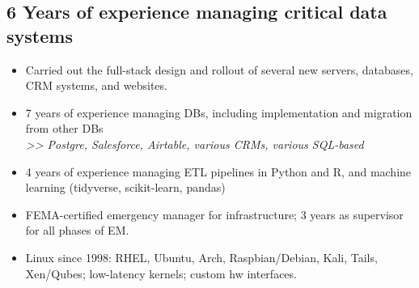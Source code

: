\documentclass[]{deedy-resume-openfont}
\begin{document}


\vspace{5pt} 
\vspace{\topsep}

\subsection{6 Years of experience managing critical data systems}
\vspace{\topsep}
    \begin{itemize}
    	\item Carried out the full-stack design and rollout of several new servers, databases, CRM systems, and websites.
        \item 7 years of experience managing DBs, including implementation and migration from other DBs \\ \textit{>> Postgre, Salesforce, Airtable, various CRMs, various SQL-based}
        \item 4 years of experience managing ETL pipelines in Python and R, and machine learning (tidyverse, scikit-learn, pandas)
        \item FEMA-certified emergency manager for infrastructure; 3 years as supervisor for all phases of EM.
        \item Linux since 1998: RHEL, Ubuntu, Arch, Raspbian/Debian, Kali, Tails, Xen/Qubes; low-latency kernels; custom hw interfaces.
    \end{itemize}
\end{document}
